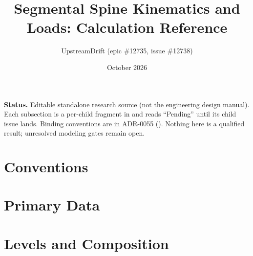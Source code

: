 \documentclass[11pt,a4paper]{article}
\title{Segmental Spine Kinematics and Loads: Calculation Reference}
\author{UpstreamDrift (epic \#12735, issue \#12738)}
\date{October 2026}
\begin{document}
\maketitle

\noindent\textbf{Status.} Editable standalone research source (not the engineering design manual). Each subsection is a per-child fragment in  and reads ``Pending'' until its child issue lands. Binding conventions are in ADR-0055 (). Nothing here is a qualified result; unresolved modeling gates remain open.

\section{Conventions}

\section{Primary Data}

\section{Levels and Composition}
\end{document}
